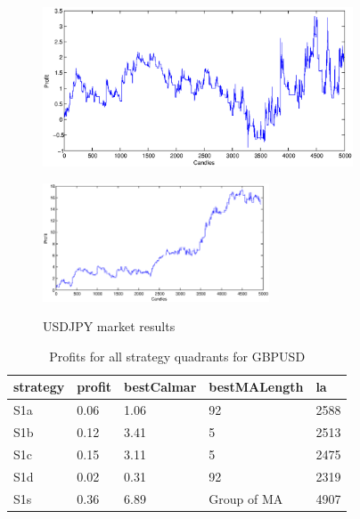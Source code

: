 \documentclass{tewiart}
\begin{document}
\begin{figure}[h]
\begin{minipage}{.49\linewidth}
\centering 
\includegraphics[width=0.82\textwidth]{images/S1d_usdjpy.eps}
\label{mansard}
\end{minipage}
\begin{minipage}{\linewidth}
\centering 
\includegraphics[width=0.6\textwidth]{images/S1s_usdjpy.eps}
\label{mansard}
\end{minipage}
\caption{USDJPY market results}
\end{figure}
\FloatBarrier


\newpage
\begin{table}[!t]
\caption{Profits for all strategy quadrants for GBPUSD} 
 \begin{center} 
 \begin{tabular}{|l|l|l|l|l|} 
 \hline \textbf{strategy} & \textbf{profit} & \textbf{bestCalmar} & \textbf{bestMALength} & \textbf{la} \\ \hline  
S1a & 0.06 & 1.06 & 92 & 2588\\ \hline 
S1b & 0.12 & 3.41 & 5 & 2513\\ \hline 
S1c & 0.15 & 3.11 & 5 & 2475\\ \hline 
S1d & 0.02 & 0.31 & 92 & 2319\\ \hline 
S1s & 0.36 & 6.89 & Group of MA & 4907\\ 
\hline \end{tabular} 
 \end{center} 
 \end{table}
\FloatBarrier
\end{document}
